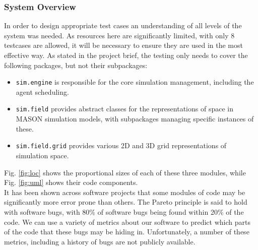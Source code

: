 \documentclass[11pt]{article}
\begin{document}
\subsubsection{System Overview}
In order to design appropriate test cases an understanding of all levels of the system was needed. As resources here are significantly limited, with only 8 testcases are allowed, it will be necessary to ensure they are used in the most effective way.
As stated in the project brief, the testing only needs to cover the following packages, but not their subpackages:

\begin{itemize}
\item \texttt{sim.engine} is responsible for the core simulation management, including the agent scheduling.
\item \texttt{sim.field} provides abstract classes for the representations of space in MASON simulation models, with subpackages managing specific instances of these.
\item \texttt{sim.field.grid} provides various 2D and 3D grid representations of simulation space.
\end{itemize}

Fig. \ref{fig:loc} shows the proportional sizes of each of these three modules, while Fig. \ref{fig:uml} shows their code components. 
\\

It has been shown across software projects that some modules of code may be significantly more error prone than others.
The Pareto principle is said to hold with software bugs, with 80\% of software bugs being found within 20\% of the code\cite[pp. 124]{pressman}.
We can use a variety of metrics about our software to predict which parts of the code that these bugs may be hiding in\cite{predicting_from_history}.
Unfortunately, a number of these metrics, including a history of bugs are not publicly available.
\\
\end{document}
